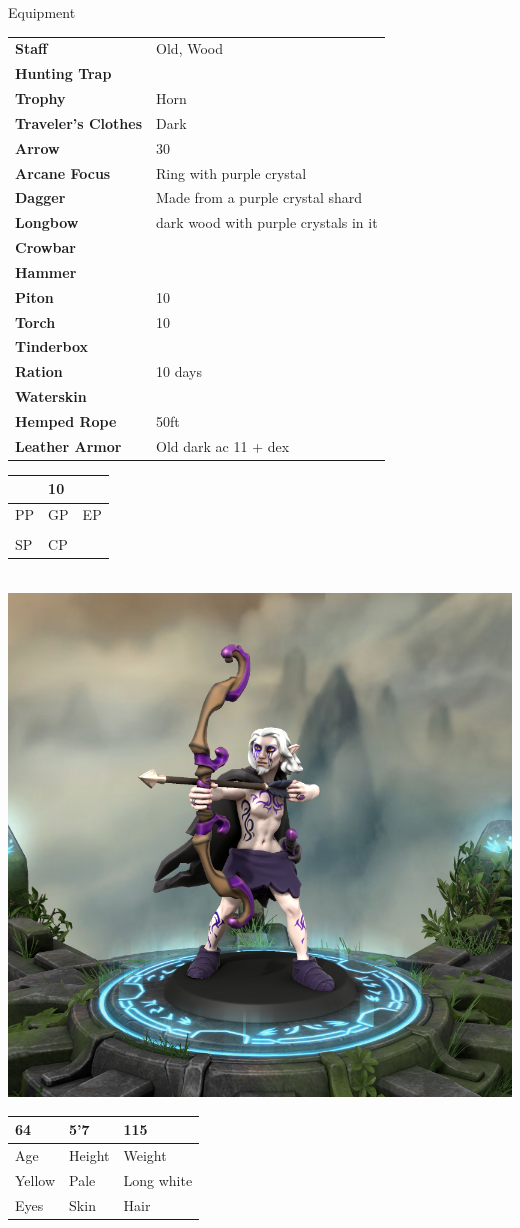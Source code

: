 \documentclass[a4paper,10pt,bg=print]{dndbook} %
\def\Age{64}
\def\Height{5'7}
\def\Weight{115}
\def\Skin{Pale}
\def\Eyes{Yellow}
\def\Hair{Long white}
\def\PP{}
\def\GP{10}
\def\ElP{}
\def\SP{}
\def\CP{}
\def\Equipment{
	\begin{tabularx}{\textwidth}{lX}
		\textbf{Staff}				& Old, Wood\\
		\textbf{Hunting Trap}		&\\
		\textbf{Trophy}				& Horn\\
		\textbf{Traveler's Clothes}	& Dark\\
		\textbf{Arrow}				& 30\\
		\textbf{Arcane Focus}		& Ring with purple crystal\\
		\textbf{Dagger}				& Made from a purple crystal shard\\
		\textbf{Longbow}			& dark wood with purple crystals in it\\
		\textbf{Crowbar}			&\\
		\textbf{Hammer}				&\\
		\textbf{Piton}				& 10\\
		\textbf{Torch}				& 10\\
		\textbf{Tinderbox}			&\\
		\textbf{Ration}				& 10 days\\
		\textbf{Waterskin}			&\\
		\textbf{Hemped Rope}		& 50ft\\
		\textbf{Leather Armor}		& Old dark ac 11 + dex\\
	\end{tabularx}
}
\begin{document}
	\begin{minipage}[t][\textheight]{.5\linewidth}\normalsize		{\Large Equipment}\\
		\Equipment
	\end{minipage}%
	\begin{minipage}[t][\textheight]{.5\linewidth}\normalsize
		\begin{tabularx}{\textwidth}{XXX}
			\PP&\GP&\ElP\\\hline
			\tiny{PP}&\tiny{GP}	&\tiny{EP}\\
			\SP&\CP&\\\hline
			\tiny{SP}& \tiny{CP}&
		\end{tabularx}\vspace*{.25cm}\\
		\includegraphics[width=\linewidth]{Character.png}\vspace*{.25cm}\\
		\begin{tabularx}{\textwidth}{XXX}
			\Age &\Height &\Weight\\\hline
			\tiny{Age}	& \tiny{Height}	&\tiny{Weight}\\
			\Eyes &\Skin &\Hair\\\hline
			\tiny{Eyes}	& \tiny{Skin}	&\tiny{Hair}\\
		\end{tabularx}
	\end{minipage} %
\end{document}
